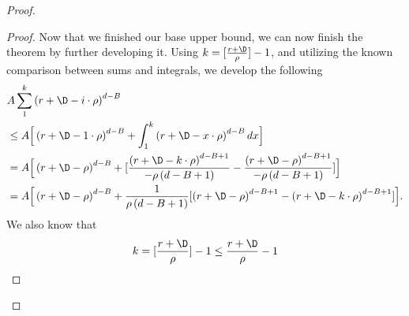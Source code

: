 \begin{proof}
\begin{proof}
    
    Now that we finished our base upper bound, we can now finish the theorem by further developing it. Using $k=[\frac{r+\D}{\rho}]-1$, and utilizing the known comparison between sums and integrals, we develop the following
    \begin{align}
        &A\sum_1^k \left(r+\D-i\cdot \rho\right)^{d-B} \nonumber\\
        &\leq A\Big[\left(r+\D - 1\cdot \rho\right)^{d-B} + \int_1^k \left(r+\D-x\cdot \rho\right)^{d-B} dx\Big] \nonumber\\
        &= A\Big[\left(r+\D-\rho\right)^{d-B} + [\frac{\left(r+\D-k\cdot \rho\right)^{d-B+1}}{-\rho\left(d-B+1\right)}-\frac{\left(r+\D-\rho\right)^{d-B+1}}{-\rho\left(d-B+1\right)}]\Big] \nonumber\\
        &=A\Big[\left(r+\D-\rho\right)^{d-B} + \frac{1}{\rho\left(d-B+1\right)}[\left(r+\D-\rho\right)^{d-B+1} - \left(r+\D-k\cdot \rho\right)^{d-B+1}]\Big].
    \end{align}
    We also know that 
    \begin{align*}
            k&=[\frac{r+\D}{\rho}]-1\leq \frac{r+\D}{\rho}-1 \\

\end{align*}
\end{proof}
\end{proof}

